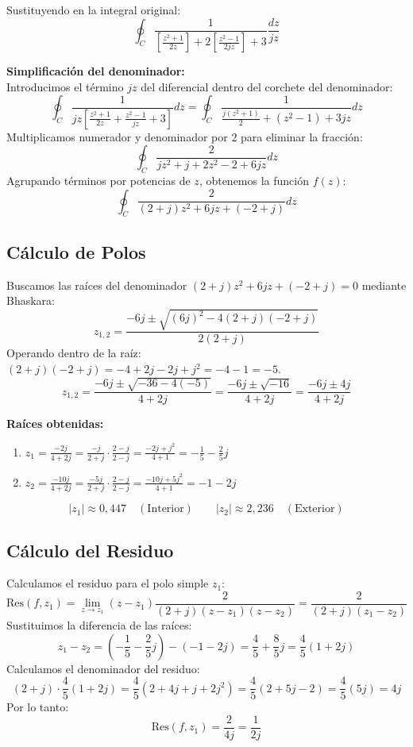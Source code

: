 \documentclass[a4paper, 12pt]{article}
\begin{document}
Sustituyendo en la integral original:
\[
\oint_{C} \frac{1}{\left[ \frac{z^2+1}{2z} \right] + 2\left[ \frac{z^2-1}{2jz} \right] + 3} \frac{dz}{jz}
\]

\textbf{Simplificación del denominador:} \\
Introducimos el término $jz$ del diferencial dentro del corchete del denominador:
\[
\oint_{C} \frac{1}{jz \left[ \frac{z^2+1}{2z} + \frac{z^2-1}{jz} + 3 \right]} dz = \oint_{C} \frac{1}{\frac{j(z^2+1)}{2} + (z^2-1) + 3jz} dz
\]
Multiplicamos numerador y denominador por 2 para eliminar la fracción:
\[
\oint_{C} \frac{2}{j z^2 + j + 2z^2 - 2 + 6jz} dz
\]
Agrupando términos por potencias de $z$, obtenemos la función $f(z)$:
\[\boxed{
\oint_{C} \frac{2}{(2+j)z^2 + 6jz + (-2+j)} dz}
\]

\subsection*{Cálculo de Polos}
Buscamos las raíces del denominador $(2+j)z^2 + 6jz + (-2+j) = 0$ mediante Bhaskara:
\[
z_{1,2} = \frac{-6j \pm \sqrt{(6j)^2 - 4(2+j)(-2+j)}}{2(2+j)}
\]
Operando dentro de la raíz: $(2+j)(-2+j) = -4+2j-2j+j^2 = -4-1 = -5$.
\[
z_{1,2} = \frac{-6j \pm \sqrt{-36 - 4(-5)}}{4+2j} = \frac{-6j \pm \sqrt{-16}}{4+2j} = \frac{-6j \pm 4j}{4+2j}
\]

\textbf{Raíces obtenidas:}
\begin{enumerate}
    \item ${z_1 = \frac{-2j}{4+2j} = \frac{-j}{2+j} \cdot \frac{2-j}{2-j} = \frac{-2j+j^2}{4+1} = -\frac{1}{5} - \frac{2}{5}j}$
    \item ${z_2 = \frac{-10j}{4+2j} = \frac{-5j}{2+j} \cdot \frac{2-j}{2-j} = \frac{-10j+5j^2}{4+1} = -1 - 2j}$


    
\end{enumerate}
\begin{equation*}
    \boxed{|z_1| \approx 0,447 \quad (\text{Interior})} \qquad    \boxed{|z_2| \approx 2,236 \quad (\text{Exterior})}
\end{equation*}

\subsection*{Cálculo del Residuo}
Calculamos el residuo para el polo simple $z_1$:
\[
\text{Res}(f, z_1) = \lim_{z \to z_1} (z-z_1) \frac{2}{(2+j)(z-z_1)(z-z_2)} = \frac{2}{(2+j)(z_1-z_2)}
\]
Sustituimos la diferencia de las raíces:
\[
z_1 - z_2 = \left( -\frac{1}{5} - \frac{2}{5}j \right) - (-1 - 2j) = \frac{4}{5} + \frac{8}{5}j = \frac{4}{5}(1+2j)
\]
Calculamos el denominador del residuo:
\[
(2+j) \cdot \frac{4}{5}(1+2j) = \frac{4}{5}(2 + 4j + j + 2j^2) = \frac{4}{5}(2 + 5j - 2) = \frac{4}{5}(5j) = 4j
\]
Por lo tanto:
\[\boxed{
\text{Res}(f, z_1) = \frac{2}{4j} = \frac{1}{2j}}
\]
\end{document}
